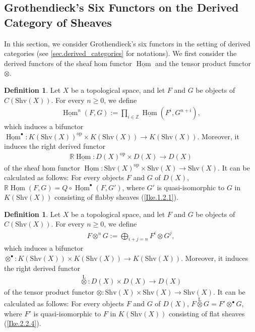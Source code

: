 \documentclass[a4paper,dvipdfmx,11pt,reqno]{amsart}
\DeclareMathOperator{\Hom}{Hom}
\DeclareMathOperator{\myop}{op}
\newcommand{\bbR}{\mathbb{R}}
\newcommand{\bbZ}{\mathbb{Z}}
\newcommand{\otimesL}{\mathop{\otimes}\limits^{\mathrm{L}}}
\newcommand{\Shv}{\mathrm{Shv}}
\theoremstyle{definition}
\newtheorem{definition}[theorem]{Definition}
\begin{document}
\subsection{Grothendieck's Six Functors on the Derived Category of Sheaves} \label{subsec.six_operations_on_the_derived_category}

In this section, we consider Grothendieck's six functors in the setting of derived categories (see \cref{sec.derived_categories} for notations).
We first consider the derived functors of the sheaf hom functor $\underline{\Hom}$ and the tensor product functor $\otimes$. 

\begin{definition}
  Let $X$ be a topological space, and let $F$ and $G$ be objects of $C(\Shv(X))$.
  For every $n \geq 0$, we define 
  \begin{align*}
    \underline{\Hom}^n(F,G):= \prod_{i \in \bbZ} \underline{\Hom}(F^i,G^{n+i}),
  \end{align*}
  which induces a bifunctor $\underline{\Hom}^{\bullet} : K(\Shv(X))^{\myop} \times K(\Shv(X)) \to K(\Shv(X))$.
  Moreover, it induces the right derived functor 
  \begin{align*}
    \bbR \underline{\Hom} : D(X)^{\myop} \times D(X) \to D(X)
  \end{align*}
  of the sheaf hom functor $\underline{\Hom} : \Shv(X)^{\myop} \times \Shv(X) \to \Shv(X)$.
  It can be calculated as follows:
  For every objects $F$ and $G$ of $D(X)$, $\bbR \underline{\Hom}(F,G) = Q \circ \underline{\Hom}^{\bullet}(F,G')$, where $G'$ is quasi-isomorphic to $G$ in $K(\Shv(X))$ consisting of flabby sheaves (\cref{Ike.1.2.1}).
\end{definition}

\begin{definition}
  Let $X$ be a topological space, and let $F$ and $G$ be objects of $C(\Shv(X))$.
  For every $n \geq 0$, we define 
  \begin{align*}
    F \otimes^n G := \bigoplus_{i+j=n} F^i \otimes G^j,
  \end{align*}
  which induces a bifunctor $\otimes^{\bullet} : K(\Shv(X)) \times K(\Shv(X)) \to K(\Shv(X))$.
  Moreover, it induces the right derived functor 
  \begin{align*}
    \otimesL : D(X) \times D(X) \to D(X)
  \end{align*}
  of the tensor product functor $\otimes : \Shv(X) \times \Shv(X) \to \Shv(X)$.
  It can be calculated as follows:
  For every objects $F$ and $G$ of $D(X)$, $F \otimesL G = F' \otimes^{\bullet} G$, where $F'$ is quasi-isomorphic to $F$ in $K(\Shv(X))$ consisting of flat sheaves (\cref{Ike.2.2.4}). 
\end{definition}
\end{document}
